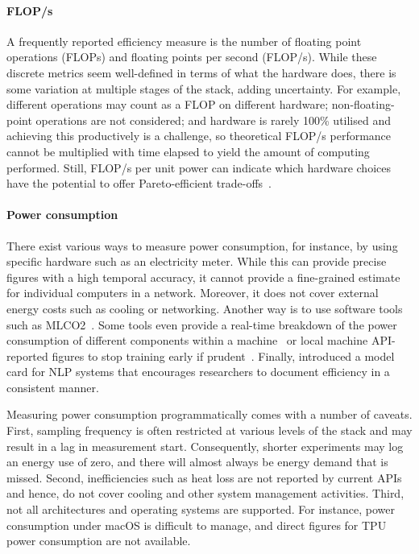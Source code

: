 \paragraph{FLOP/s} 
A frequently reported efficiency measure is the number of floating point operations (FLOPs) and floating points per second (FLOP/s). While these discrete metrics seem well-defined in terms of what the hardware does, there is some variation at multiple stages of the stack, adding uncertainty. For example, different operations may count as a FLOP on different hardware; non-floating-point operations are not considered; and hardware is rarely 100\% utilised and achieving this productively is a challenge, so theoretical FLOP/s performance cannot be multiplied with time elapsed to yield the amount of computing performed. Still, FLOP/s per unit power can indicate which hardware choices have the potential to offer Pareto-efficient trade-offs~\cite{hsu2005towards}.

\paragraph{Power consumption} 

There exist various ways to measure power consumption, for instance, by using specific hardware such as an electricity meter. While this can provide precise figures with a high temporal accuracy, it cannot provide a fine-grained estimate for individual computers in a network. Moreover, it does not cover external energy costs such as cooling or networking. Another way is to use software tools such as MLCO2~\citep{lacoste2019quantifying}. Some tools even provide a real-time breakdown of the power consumption of different components within a machine~\citep{henderson2020towards} or local machine API-reported figures to stop training early if prudent~\citep{anthony2020carbontracker}. Finally, \citet{hershcovich2022towards} introduced a model card for NLP systems that encourages researchers to document efficiency in a consistent manner.

Measuring power consumption programmatically comes with a number of caveats. First, sampling frequency is often restricted at various levels of the stack and may result in a lag in measurement start. Consequently, shorter experiments may log an energy use of zero, and there will almost always be energy demand that is missed. Second, inefficiencies such as heat loss are not reported by current APIs and hence, do not cover cooling and other system management activities. Third, not all architectures and operating systems are supported. For instance, power consumption under macOS is difficult to manage, and direct figures for TPU power consumption are not available.

